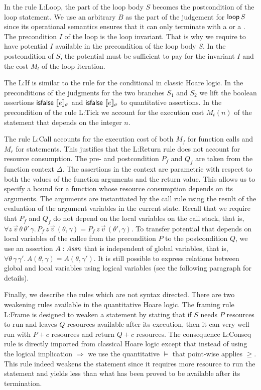 \documentclass{sigplanconf}
\begin{document}
{In the rule {\sc L:Loop}, the  part of the
loop body $S$ becomes the postcondition of the loop statement. We use
an arbitrary $B$ as the  part of the judgement for
$\mathsf{loop}\, S$ since its operational semantics ensures that it can
only terminate with a  or a .  The
precondition $I$ of the loop is the loop invariant.  That is why we
require to have potential $I$ available in the precondition of the
loop body $S$.  In the postcondition of $S$, the potential must be
sufficient to pay for the invariant $I$ and the cost $M_l$ of the loop
iteration.

The {\sc L:If} is similar to the rule for the conditional in classic
Hoare logic.  In the preconditions of the judgments for the two
branches $S_1$ and $S_2$ we lift the boolean assertions
$\mathsf{isfalse}~\llbracket e \rrbracket_{\sigma}$ and $\mathsf{isfalse}~\llbracket e \rrbracket_{\sigma}$ to
quantitative assertions.  In the precondition of the rule {\sc L:Tick}
we account for the execution cost $M_t(n)$ of the 
statement that depends on the integer $n$.

The rule {\sc L:Call} accounts for the execution cost of both $M_f$
for function calls and $M_r$ for  statements.
This justifies that the {\sc L:Return} rule does not account
  for resource consumption. The pre- and postcondition $P_f$ and
$Q_f$ are taken from the function context $\Delta$.  The assertions in
the context are parametric with respect to both the values of the
function arguments and the return value. This allows us to specify a
bound for a function whose resource consumption depends on its
arguments.  The arguments are instantiated by the call rule
using the result of the evaluation of the argument variables in the
current state.  Recall that we require that $P_f$ and $Q_f$ do
  not depend on the local variables on the call stack, that is,
  $\forall z \, \vec v \, \theta \, \theta' \, \gamma . \, P_f \, z \,
  \vec v \, (\theta,\gamma) = P_f \, z \, \vec v \,
  (\theta',\gamma)$. To transfer potential that depends on local
variables of the callee from the precondition $P$ to the postcondition
$Q$, we use an assertion $A : \mathit{Assn}$ that is independent of global
variables, that is, $\forall \theta \, \gamma \, \gamma' . \, A
(\theta,\gamma) = A(\theta,\gamma')$.  It is still possible to express
relations between global and local variables using logical
variables (see the following paragraph for details).

Finally, we describe the rules which are not syntax directed.  There
are two weakening rules available in the quantitative Hoare logic.
The framing rule {\sc L:Frame} is designed to weaken a statement by
stating that if $S$ needs $P$ resources to run and leaves $Q$
resources available after its execution, then it can very well run
with $P + c$ resources and return $Q + c$ resources.  The consequence
{\sc L:Conseq} rule is directly imported from classical Hoare logic
except that instead of using the logical implication $\Rightarrow$ we
use the quantitative $\models$ that point-wise applies $\ge$.  This
rule indeed weakens the statement since it requires more resource to
run the statement and yields less than what has been proved to be
available after its termination.

}
\end{document}
